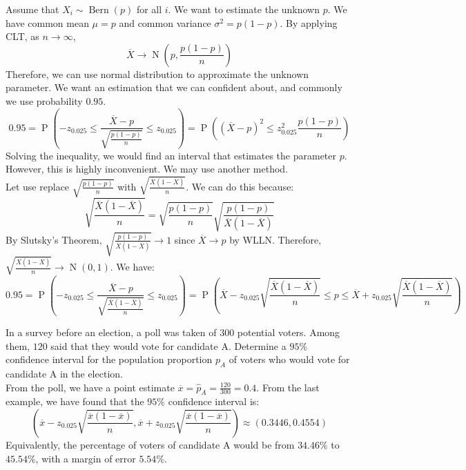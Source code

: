 \documentclass{huhtakm-template-book-v2}
\DeclareMathOperator{\prob}{P}
\DeclareMathOperator{\Bern}{Bern}
\DeclareMathOperator{\N}{N}
\begin{document}
\begin{eg}
	Assume that $X_{i}\sim\Bern(p)$ for all $i$. We want to estimate the unknown $p$. We have common mean $\mu=p$ and common variance $\sigma^{2}=p(1-p)$. By applying CLT, as $n\to\infty$,
	\begin{equation*}
		\overline{X}\to\N\left(p,\frac{p(1-p)}{n}\right)
	\end{equation*}
	Therefore, we can use normal distribution to approximate the unknown parameter. We want an estimation that we can confident about, and commonly we use probability $0.95$.
	\begin{equation*}
		0.95=\prob\left(-z_{0.025}\leq\frac{\overline{X}-p}{\sqrt{\frac{p(1-p)}{n}}}\leq z_{0.025}\right)=\prob\left((\overline{X}-p)^{2}\leq z_{0.025}^{2}\frac{p(1-p)}{n}\right)
	\end{equation*} 
	Solving the inequality, we would find an interval that estimates the parameter $p$. However, this is highly inconvenient. We may use another method.\\
	Let use replace $\sqrt{\frac{p(1-p)}{n}}$ with $\sqrt{\frac{\overline{X}(1-\overline{X})}{n}}$. We can do this because:
	\begin{equation*}
		\sqrt{\frac{\overline{X}(1-\overline{X})}{n}}=\sqrt{\frac{p(1-p)}{n}}\sqrt{\frac{p(1-p)}{\overline{X}(1-\overline{X})}}
	\end{equation*}
	By Slutsky's Theorem, $\sqrt{\frac{p(1-p)}{\overline{X}(1-\overline{X})}}\to 1$ since $\overline{X}\to p$ by WLLN. Therefore, $\sqrt{\frac{\overline{X}(1-\overline{X})}{n}}\to\N(0,1)$. We have:
	\begin{equation*}
		0.95=\prob\left(-z_{0.025}\leq\frac{\overline{X}-p}{\sqrt{\frac{\overline{X}(1-\overline{X})}{n}}}\leq z_{0.025}\right)=\prob\left(\overline{X}-z_{0.025}\sqrt{\frac{\overline{X}(1-\overline{X})}{n}}\leq p\leq\overline{X}+z_{0.025}\sqrt{\frac{\overline{X}(1-\overline{X})}{n}}\right)
	\end{equation*} 
\end{eg}
\begin{eg}
	In a survey before an election, a poll was taken of $300$ potential voters. Among them, $120$ said that they would vote for candidate A. Determine a $95\%$ confidence interval for the population proportion $p_{A}$ of voters who would vote for candidate A in the election.\\
	From the poll, we have a point estimate $\overline{x}=\hat{p}_{A}=\frac{120}{300}=0.4$. From the last example, we have found that the $95\%$ confidence interval is:
	\begin{equation*}
		\left(\overline{x}-z_{0.025}\sqrt{\frac{\overline{x}(1-\overline{x})}{n}},\overline{x}+z_{0.025}\sqrt{\frac{\overline{x}(1-\overline{x})}{n}}\right)\approx(0.3446,0.4554)
	\end{equation*}
	Equivalently, the percentage of voters of candidate A would be from $34.46\%$ to $45.54\%$, with a margin of error $5.54\%$.
\end{eg}
\end{document}
